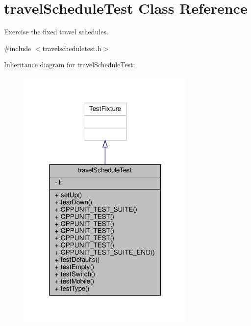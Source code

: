 \hypertarget{classtravelScheduleTest}{}\section{travel\+Schedule\+Test Class Reference}
\label{classtravelScheduleTest}


Exercise the fixed travel schedules.  




{\ttfamily \#include $<$travelscheduletest.\+h$>$}



Inheritance diagram for travel\+Schedule\+Test\+:\nopagebreak
\begin{figure}[H]
\begin{center}
\leavevmode
\includegraphics[width=250pt]{classtravelScheduleTest__inherit__graph}
\end{center}
\end{figure}


